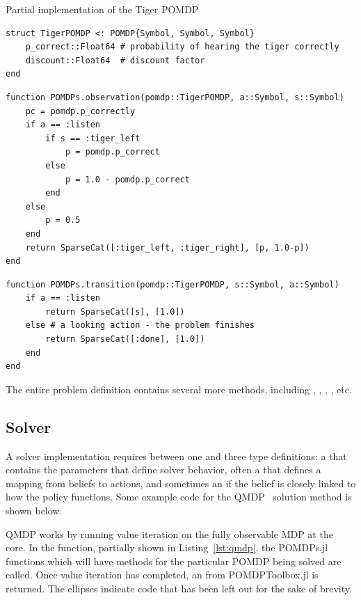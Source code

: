 \begin{lstfloat}
    \caption{Partial implementation of the Tiger POMDP}\label{lst:tiger}
\begin{lstlisting}
struct TigerPOMDP <: POMDP{Symbol, Symbol, Symbol}
    p_correct::Float64 # probability of hearing the tiger correctly
    discount::Float64  # discount factor
end
\end{lstlisting}

\begin{lstlisting}
function POMDPs.observation(pomdp::TigerPOMDP, a::Symbol, s::Symbol)
    pc = pomdp.p_correctly
    if a == :listen
        if s == :tiger_left
            p = pomdp.p_correct
        else
            p = 1.0 - pomdp.p_correct
        end
    else
        p = 0.5
    end
    return SparseCat([:tiger_left, :tiger_right], [p, 1.0-p])
end
\end{lstlisting}

\begin{lstlisting}
function POMDPs.transition(pomdp::TigerPOMDP, s::Symbol, a::Symbol)
    if a == :listen
        return SparseCat([s], [1.0]) 
    else # a looking action - the problem finishes
        return SparseCat([:done], [1.0])
    end
end
\end{lstlisting}
\end{lstfloat}

The entire problem definition contains several more methods, including , , , , etc.

\subsection{Solver} 

A solver implementation requires between one and three type definitions: a  that contains the parameters that define solver behavior, often a  that defines a mapping from beliefs to actions, and sometimes an  if the belief is closely linked to how the policy functions.
Some example code for the QMDP~\citep{littman1995} solution method is shown below.

QMDP works by running value iteration on the fully observable MDP at the core.
In the  function, partially shown in Listing~\ref{lst:qmdp}, the POMDPs.jl functions which will have methods for the particular POMDP being solved are called.
Once value iteration has completed, an  from POMDPToolbox.jl is returned.
The ellipses indicate code that has been left out for the sake of brevity.

